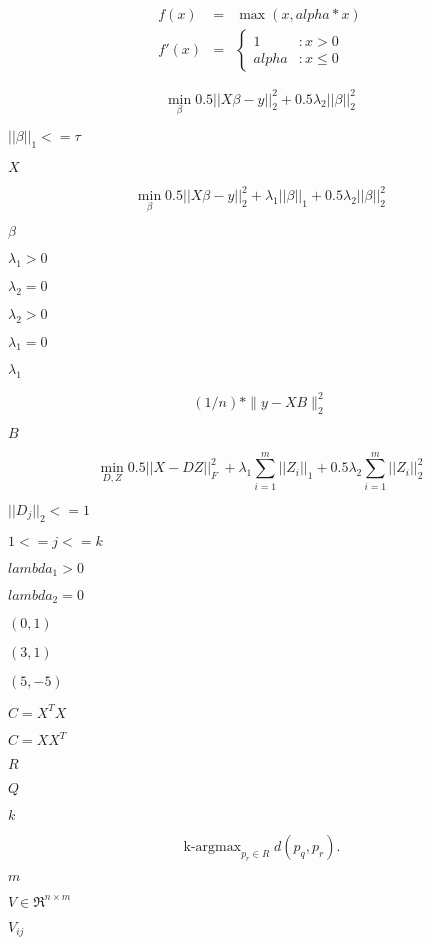 \documentclass{article}
\begin{document}
\begin{eqnarray*} f(x) &=& \max(x, alpha*x) \\ f'(x) &=& \left\{ \begin{array}{lr} 1 & : x > 0 \\ alpha & : x \le 0 \end{array} \right. \end{eqnarray*}
\pagebreak

\[ \min_{\beta} 0.5 || X \beta - y ||_2^2 + 0.5 \lambda_2 || \beta ||_2^2 \]
\pagebreak

$ ||\beta||_1 <= \tau $
\pagebreak

$ X $
\pagebreak

\[ \min_{\beta} 0.5 || X \beta - y ||_2^2 + \lambda_1 || \beta ||_1 + 0.5 \lambda_2 || \beta ||_2^2 \]
\pagebreak

$ \beta $
\pagebreak

$ \lambda_1 > 0 $
\pagebreak

$ \lambda_2 = 0 $
\pagebreak

$ \lambda_2 > 0 $
\pagebreak

$ \lambda_1 = 0 $
\pagebreak

$ \lambda_1 $
\pagebreak

\[ (1 / n) * \| y - X B \|^2_2 \]
\pagebreak

$ B $
\pagebreak

\[ \min_{D,Z} 0.5 ||X - D Z||_{F}^2\ + \lambda_1 \sum_{i=1}^m ||Z_i||_1 + 0.5 \lambda_2 \sum_{i=1}^m ||Z_i||_2^2 \]
\pagebreak

$ ||D_j||_2 <= 1 $
\pagebreak

$ 1 <= j <= k $
\pagebreak

$ lambda_1 > 0 $
\pagebreak

$ lambda_2 = 0 $
\pagebreak

$(0, 1)$
\pagebreak

$(3, 1)$
\pagebreak

$(5, -5)$
\pagebreak

$ C = X^T X $
\pagebreak

$ C = X X^T $
\pagebreak

$R$
\pagebreak

$Q$
\pagebreak

$k$
\pagebreak

\[ \operatorname{k-argmax}_{p_r \in R} d(p_q, p_r). \]
\pagebreak

$m$
\pagebreak

$V \in \Re^{n \times m}$
\pagebreak

$V_{ij}$
\pagebreak
\end{document}
